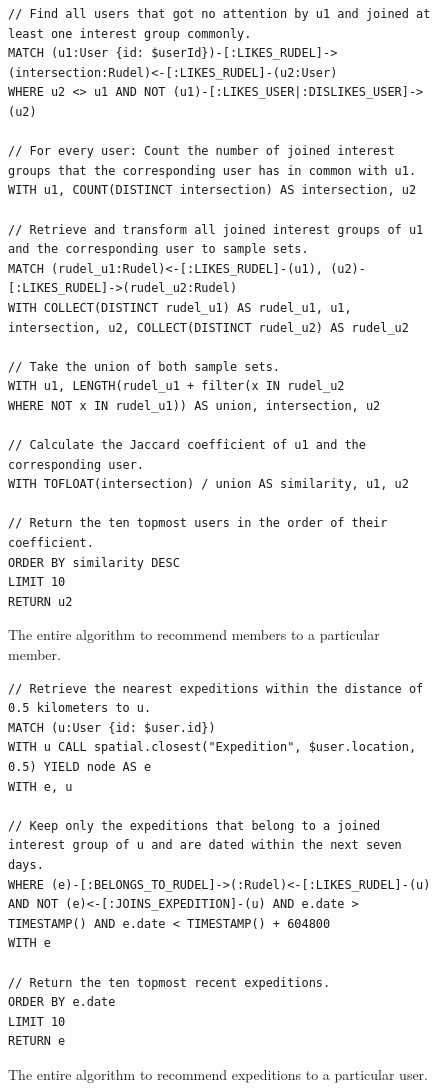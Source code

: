 \documentclass[12pt,numbers=noenddot,parskip,bibliography=totocnumbered,listof=totocnumbered,draft]{scrreprt}
\begin{document}
\begin{figure}
\centering
\begin{lstlisting}
// Find all users that got no attention by u1 and joined at least one interest group commonly.
MATCH (u1:User {id: $userId})-[:LIKES_RUDEL]->(intersection:Rudel)<-[:LIKES_RUDEL]-(u2:User) 
WHERE u2 <> u1 AND NOT (u1)-[:LIKES_USER|:DISLIKES_USER]->(u2) 

// For every user: Count the number of joined interest groups that the corresponding user has in common with u1.
WITH u1, COUNT(DISTINCT intersection) AS intersection, u2 

// Retrieve and transform all joined interest groups of u1 and the corresponding user to sample sets.
MATCH (rudel_u1:Rudel)<-[:LIKES_RUDEL]-(u1), (u2)-[:LIKES_RUDEL]->(rudel_u2:Rudel) 
WITH COLLECT(DISTINCT rudel_u1) AS rudel_u1, u1, intersection, u2, COLLECT(DISTINCT rudel_u2) AS rudel_u2 

// Take the union of both sample sets.
WITH u1, LENGTH(rudel_u1 + filter(x IN rudel_u2 
WHERE NOT x IN rudel_u1)) AS union, intersection, u2 

// Calculate the Jaccard coefficient of u1 and the corresponding user. 
WITH TOFLOAT(intersection) / union AS similarity, u1, u2 

// Return the ten topmost users in the order of their coefficient.
ORDER BY similarity DESC 
LIMIT 10
RETURN u2
\end{lstlisting}
\caption[Algorithm to recommend members]{The entire algorithm to recommend members to a particular member.}
\label{recommendationalogirthmmembers}
\end{figure}

\begin{figure}
\centering
\begin{lstlisting}
// Retrieve the nearest expeditions within the distance of 0.5 kilometers to u.
MATCH (u:User {id: $user.id})
WITH u CALL spatial.closest("Expedition", $user.location, 0.5) YIELD node AS e 
WITH e, u 

// Keep only the expeditions that belong to a joined interest group of u and are dated within the next seven days.
WHERE (e)-[:BELONGS_TO_RUDEL]->(:Rudel)<-[:LIKES_RUDEL]-(u) AND NOT (e)<-[:JOINS_EXPEDITION]-(u) AND e.date > TIMESTAMP() AND e.date < TIMESTAMP() + 604800 
WITH e

// Return the ten topmost recent expeditions.
ORDER BY e.date 
LIMIT 10
RETURN e
\end{lstlisting}
\caption[Algorithm to recommend expeditions]{The entire algorithm to recommend expeditions to a particular user.}
\label{recommendationalogirthmexpeditions}
\end{figure}
\end{document}
